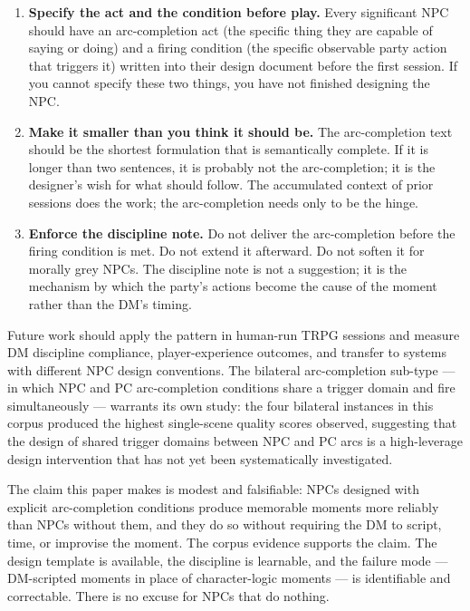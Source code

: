 \begin{enumerate}
  \item \textbf{Specify the act and the condition before play.}
    Every significant NPC should have an arc-completion act (the specific thing
    they are capable of saying or doing) and a firing condition (the specific
    observable party action that triggers it) written into their design document
    before the first session. If you cannot specify these two things, you have
    not finished designing the NPC.

  \item \textbf{Make it smaller than you think it should be.}
    The arc-completion text should be the shortest formulation that is semantically
    complete. If it is longer than two sentences, it is probably not the arc-completion;
    it is the designer's wish for what should follow. The accumulated context of
    prior sessions does the work; the arc-completion needs only to be the hinge.

  \item \textbf{Enforce the discipline note.}
    Do not deliver the arc-completion before the firing condition is met. Do not
    extend it afterward. Do not soften it for morally grey NPCs. The discipline
    note is not a suggestion; it is the mechanism by which the party's actions
    become the cause of the moment rather than the DM's timing.
\end{enumerate}

Future work should apply the pattern in human-run TRPG sessions and measure
DM discipline compliance, player-experience outcomes, and transfer to systems
with different NPC design conventions. The bilateral arc-completion sub-type
--- in which NPC and PC arc-completion conditions share a trigger domain and
fire simultaneously --- warrants its own study: the four bilateral instances
in this corpus produced the highest single-scene quality scores observed,
suggesting that the design of shared trigger domains between NPC and PC arcs
is a high-leverage design intervention that has not yet been systematically
investigated.

The claim this paper makes is modest and falsifiable: NPCs designed with
explicit arc-completion conditions produce memorable moments more reliably
than NPCs without them, and they do so without requiring the DM to script,
time, or improvise the moment. The corpus evidence supports the claim. The
design template is available, the discipline is learnable, and the failure
mode --- DM-scripted moments in place of character-logic moments --- is
identifiable and correctable. There is no excuse for NPCs that do nothing.
